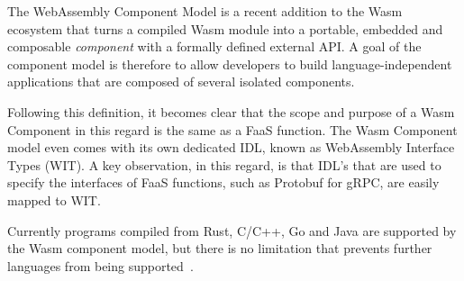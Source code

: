 The WebAssembly Component Model \cite{compmodel} is a recent addition to the Wasm ecosystem that turns a compiled Wasm module into a portable, embedded and composable \emph{component} with a formally defined external API. A goal of the component model is therefore to allow developers to build language-independent applications that are composed of several isolated components.

Following this definition, it becomes clear that the scope and purpose of a Wasm Component in this regard is the same as a FaaS function. The Wasm Component model even comes with its own dedicated IDL, known as WebAssembly Interface Types (WIT). A key observation, in this regard, is that IDL's that are used to specify the interfaces of FaaS functions, such as Protobuf for gRPC, are easily mapped to WIT.

Currently programs compiled from Rust, C/C++, Go and Java are supported by the Wasm component model, but there is no limitation that prevents further languages from being supported~\cite{bindgen}.


